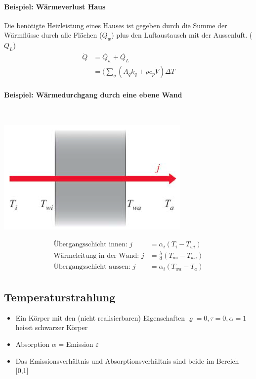 \documentclass[
a4paper,
oneside,
landscape, 
8pt,
]{scrartcl}
\begin{document}
\begin{multicols*}{2}
\paragraph{Beispiel: Wärmeverlust Haus}
Die benötigte Heizleistung eines Hauses ist gegeben durch die Summe der Wärmflüsse durch alle Flächen ($Q_w$) plus den Luftaustausch mit der Aussenluft. ($Q_L$)
\begin{align*}
\dot{Q} &= \dot{Q_w}  + \dot{Q_L} \\
		&= (\sum_q(A_q k_q+\rho c_p \dot{V}) \Delta T
\end{align*}


\paragraph{Beispiel: Wärmedurchgang durch eine ebene Wand} \hfill \\
\begin{minipage}[h!]{0.5\linewidth}
\includegraphics[width=0.8\linewidth]{images/waermedurchgang}
\end{minipage}
\hfill
\begin{minipage}[h!]{0.5\linewidth}
	\begin{align*}
	\text{Übergangsschicht innen:  } j &= \alpha_i (T_i - T_{wi}) \\
	\text{Wärmeleitung in der Wand:  } j &= \frac{\lambda}{d}(T_{wi} - T_{wa}) \\
	\text{Übergangsschicht aussen:  }  j &= \alpha_i (T_{wa} - T_{a})  \\
	\end{align*}
\end{minipage}


\vfill\null
\columnbreak

\subsection{Temperaturstrahlung}
\begin{itemize}
	\item Ein Körper mit den (nicht realisierbaren) Eigenschaften $\varrho = 0, \tau = 0, \alpha = 1$ heisst schwarzer Körper
	\item Absorption $\alpha$ = Emission $\varepsilon$
	\item Das Emissionsverhältnis und Absorptionsverhältnis sind beide im Bereich [0,1]
\end{itemize}


\end{multicols*}
\end{document}

